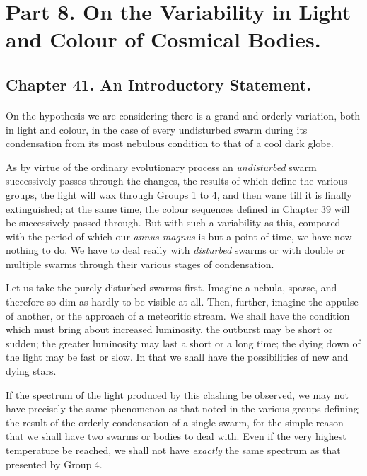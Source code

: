 \documentclass[a4paper, 12pt, oneside, polutonikogreek, english]{article}
\begin{document}
\section{Part 8. On the Variability in Light and Colour of Cosmical Bodies.}
\subsection{Chapter 41. An Introductory Statement.}
\paragraph{}
On the hypothesis we are considering there is a grand and orderly variation, both in light and colour, in the case of every undisturbed swarm during its condensation from its most nebulous condition to that of a cool dark globe.

As by virtue of the ordinary evolutionary process an \emph{undisturbed} swarm successively passes through the changes, the results of which define the various groups, the light will wax through Groups 1 to 4, and then wane till it is finally extinguished; at the same time, the colour sequences defined in Chapter 39 will be successively passed through. But with such a variability as this, compared with the period of which our \emph{annus magnus} is but a point of time, we have now nothing to do. We have to deal really with \emph{disturbed} swarms or with double or multiple swarms through their various stages of condensation.

Let us take the purely disturbed swarms first. Imagine a nebula, sparse, and therefore so dim as hardly to be visible at all. Then, further, imagine the appulse of another, or the approach of a meteoritic stream. We shall have the condition which must bring about increased luminosity, the outburst may be short or sudden; the greater luminosity may last a short or a long time; the dying down of the light may be fast or slow. In that we shall have the possibilities of new and dying stars.

If the spectrum of the light produced by this clashing be observed, we may not have precisely the same phenomenon as that noted in the various groups defining the result of the orderly condensation of a single swarm, for the simple reason that we shall have two swarms or bodies to deal with. Even if the very highest temperature be reached, we shall not have \emph{exactly} the same spectrum as that presented by Group 4.
\end{document}
